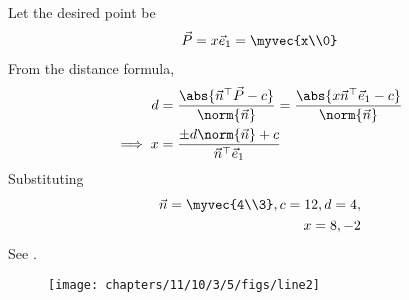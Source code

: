 Let the desired point be
\begin{align}
	\vec{P} = x\vec{e}_{1} = \myvec{x\\0}
\end{align}
From the distance formula, 
\begin{align}
	d &= \frac{\abs{\vec{n}^\top\vec{P}-c}}{\norm{\vec{n}}}
	  = \frac{\abs{x\vec{n}^\top\vec{e}_{1}-c}}{\norm{\vec{n}}}
	  \\
	  \implies 
		x &= \frac{\pm d\norm{\vec{n}}+c}{\vec{n}^\top\vec{e}_{1}}
\end{align}
Substituting
\begin{align}
		\vec{n} = \myvec{4\\3} , c = 12,
	d = 4,
	\\
	x = 8,
	 -2
\end{align}
See .	
\begin{figure}[H]
	\begin{center} 
	    \texttt{[image: chapters/11/10/3/5/figs/line2]}
	\end{center}
\caption{}
\label{fig:11/10/3/5/Fig1}
\end{figure}


